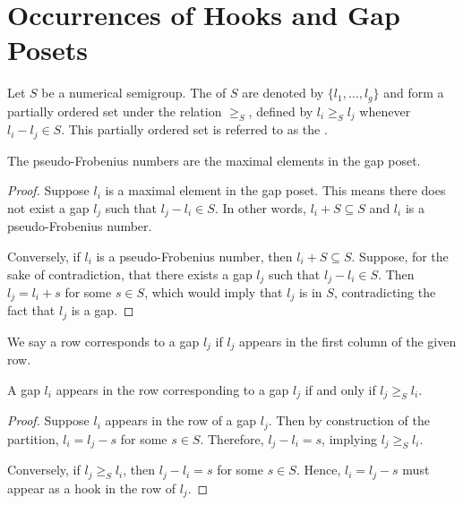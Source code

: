 \section{Occurrences of Hooks and Gap Posets}

\begin{definition}
Let \( S \) be a numerical semigroup. The  of \( S \) are denoted by \(\{l_1, \dots, l_g\}\) and form a partially ordered set under the relation \( \ge_S \), defined by \( l_i \ge_S l_j \) whenever \( l_i - l_j \in S \). This partially ordered set is referred to as the .
\end{definition}

\begin{proposition}
The pseudo-Frobenius numbers are the maximal elements in the gap poset.
\end{proposition}

\begin{proof}
    Suppose \( l_i \) is a maximal element in the gap poset. This means there does not exist a gap \( l_j \) such that \( l_j - l_i \in S \). In other words, \( l_i + S \subseteq S \) and \( l_i \) is a pseudo-Frobenius number.
    
    Conversely, if \( l_i \) is a pseudo-Frobenius number, then \( l_i + S \subseteq S \). Suppose, for the sake of contradiction, that there exists a gap \( l_j \) such that \( l_j - l_i \in S \). Then \( l_j = l_i + s \) for some \( s \in S \), which would imply that \( l_j \) is in \( S \), contradicting the fact that \( l_j \) is a gap.
\end{proof}


We say a row corresponds to a gap \(l_j\) if \(l_j\) appears in the first column of the given row. 

\begin{proposition}
A gap \( l_i \) appears in the row corresponding to a gap \( l_j \) if and only if \( l_j \ge_S l_i \).
\end{proposition}

\begin{proof}
Suppose \( l_i \) appears in the row of a gap \( l_j \). Then by construction of the partition, \( l_i = l_j - s \) for some \( s \in S \). Therefore, \( l_j - l_i = s \), implying \( l_j \ge_S l_i \).

Conversely, if \( l_j \ge_S l_i \), then \( l_j - l_i = s \) for some \( s \in S \). Hence, \( l_i = l_j - s \) must appear as a hook in the row of \( l_j \).
\end{proof}


